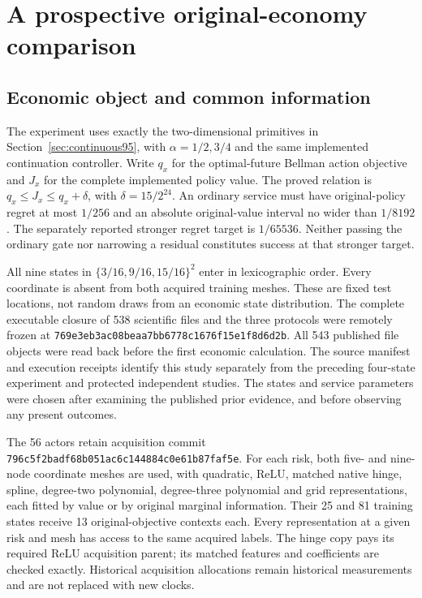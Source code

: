 \section{A prospective original-economy comparison}\label{sec:experiment126}

\subsection{Economic object and common information}

The experiment uses exactly the two-dimensional primitives in
Section~\ref{sec:continuous95}, with $\alpha=1/2,3/4$ and the same
implemented continuation controller. Write $q_x$ for the optimal-future
Bellman action objective and $J_x$ for the complete implemented policy value.
The proved relation is $q_x\le J_x\le q_x+\delta$, with
$\delta=15/2^{24}$. An ordinary service must have original-policy regret
at most $1/256$ and an absolute original-value interval no wider than
$1/8192$. The separately reported stronger regret target is $1/65536$.
Neither passing the ordinary gate nor narrowing a residual constitutes
success at that stronger target.

All nine states in $\{3/16,9/16,15/16\}^2$ enter in lexicographic order.
Every coordinate is absent from both acquired training meshes. These are
fixed test locations, not random draws from an economic state distribution.
The complete executable closure of 538 scientific files and the three
protocols were remotely frozen at
\nolinkurl{769e3eb3ac08beaa7bb6778c1676f15e1f8d6d2b}.
All 543 published file objects were read back before the first economic
calculation. The source manifest and execution receipts identify this study
separately from the preceding four-state experiment and protected independent
studies. The states and service parameters were chosen after examining the
published prior evidence, and before observing any present outcomes.

The 56 actors retain acquisition commit
\nolinkurl{796c5f2badf68b051ac6c144884c0e61b87faf5e}.
For each risk, both five- and nine-node coordinate meshes are used, with
quadratic, ReLU, matched native hinge, spline, degree-two polynomial,
degree-three polynomial and grid representations, each fitted by value or
by original marginal information. Their 25 and 81 training states receive
13 original-objective contexts each. Every representation at a given risk
and mesh has access to the same acquired labels. The hinge copy pays its
required ReLU acquisition parent; its matched features and coefficients
are checked exactly. Historical acquisition allocations remain historical
measurements and are not replaced with new clocks.

